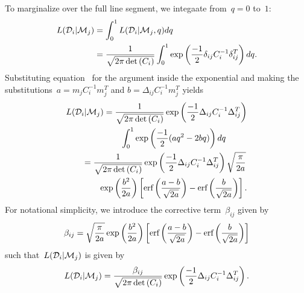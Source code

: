 \documentclass[ms.tex]{subfiles}
\begin{document}
To marginalize over the full line segment, we integaate from~$q = 0$ to~$1$:
\begin{subequations}\begin{align}
L(\mathcal{D}_i | \mathcal{M}_j) &= \int_0^1 L(\mathcal{D}_i | \mathcal{M}_j, q) dq
\\
&= \frac{1}{\sqrt{2\pi\det{(C_i)}}} \int_0^1 \exp \left(
\frac{-1}{2}\delta_{ij}C_i^{-1}\delta_{ij}^T
\right) dq.
\end{align}\end{subequations}
Substituting equation~ for the argument inside the
exponential and making the substitutions~$a = m_j C_i^{-1} m_j^T$ and
$b = \Delta_{ij} C_i^{-1} m_j^T$ yields
\begin{subequations}\begin{align}
\begin{split}
L(\mathcal{D}_i | \mathcal{M}_j) &= \frac{1}{\sqrt{2\pi \det{(C_i)}}}
\exp\left(\frac{-1}{2}\Delta_{ij} C_i^{-1} \Delta_{ij}^T\right)
\\
&\qquad \int_0^1 \exp\left(\frac{-1}{2}(aq^2 - 2bq)\right)dq
\end{split}
\\
\begin{split}
&= \frac{1}{\sqrt{2\pi\det{(C_i)}}}
\exp\left(\frac{-1}{2}\Delta_{ij}C_i^{-1}\Delta_{ij}^T\right)
\sqrt{\frac{\pi}{2a}}
\\
&\qquad \exp\left(\frac{b^2}{2a}\right)
\left[\text{erf}\left(\frac{a - b}{\sqrt{2a}}\right) - \text{erf}\left(\frac{b}{\sqrt{2a}}
\right)\right].
\end{split}
\end{align}\end{subequations}
For notational simplicity, we introduce the corrective term~$\beta_{ij}$ given
by
\begin{equation}
\beta_{ij} = \sqrt{\frac{\pi}{2a}} \exp\left(\frac{b^2}{2a}\right)
\left[\text{erf}\left(\frac{a - b}{\sqrt{2a}}\right) - \text{erf}\left(\frac{b}{\sqrt{2a}}
\right)\right]
\label{eq:corrective_beta}
\end{equation}
such that~$L(\mathcal{D}_i | \mathcal{M}_j)$ is given by
\begin{equation}
L(\mathcal{D}_i | \mathcal{M}_j) = \frac{\beta_{ij}}{\sqrt{2\pi \det{(C_i)}}}
\exp\left(\frac{-1}{2}\Delta_{ij} C_i^{-1} \Delta_{ij}^T\right).
\end{equation}
\end{document}
